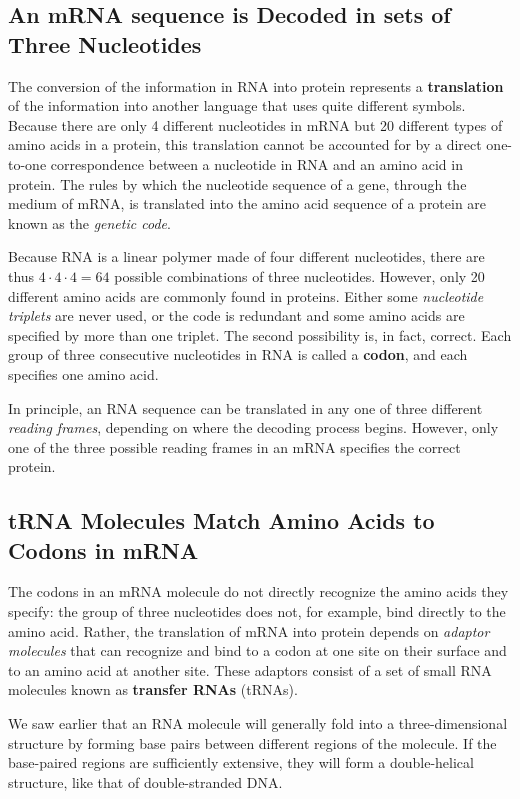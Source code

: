\subsection{An mRNA sequence is Decoded in sets of Three Nucleotides}

The conversion of the information in RNA into protein represents a \textbf{translation}
of the information into another language that uses
quite different symbols. Because there are only 4 different nucleotides in
mRNA but 20 different types of amino acids in a protein, this translation
cannot be accounted for by a direct one-to-one correspondence between
a nucleotide in RNA and an amino acid in protein. The rules by which the
nucleotide sequence of a gene, through the medium of mRNA, is translated
into the amino acid sequence of a protein are known as the \textit{genetic
code}.

Because RNA is a linear polymer made of four different
nucleotides, there are thus $4 \cdot 4 \cdot 4 = 64$ possible combinations of
three nucleotides. However, only 20 different amino acids are commonly
found in proteins. Either some \textit{nucleotide triplets} are never used, or
the code is redundant and some amino acids are
specified by more than one triplet. The second possibility is, in fact, correct.
Each group of three consecutive nucleotides in RNA is called a \textbf{codon},
and each specifies one amino acid.

In principle, an RNA sequence can be translated in any one of three different
\textit{reading frames}, depending on where the decoding process begins. However,
only one of the three possible reading frames in an mRNA specifies the correct protein.

\subsection{tRNA Molecules Match Amino Acids to Codons in mRNA}

The codons in an mRNA molecule do not directly recognize the amino
acids they specify: the group of three nucleotides does not, for example,
bind directly to the amino acid. Rather, the translation of mRNA into
protein depends on \textit{adaptor molecules} that can recognize and bind to a
codon at one site on their surface and to an amino acid at another site.
These adaptors consist of a set of small RNA molecules known as \textbf{transfer RNAs} (tRNAs).

We saw earlier that an RNA molecule will generally fold into a three-dimensional
structure by forming base pairs between different regions
of the molecule. If the base-paired regions are sufficiently extensive, they
will form a double-helical structure, like that of double-stranded DNA.

